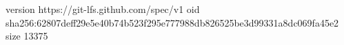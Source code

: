 version https://git-lfs.github.com/spec/v1
oid sha256:62807deff29e5e40b74b523f295e777988db826525be3d99331a8dc069fa45e2
size 13375

